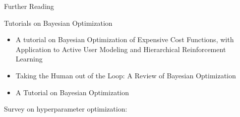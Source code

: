 \begin{frame}[c]{Further Reading}

Tutorials on Bayesian Optimization
\begin{itemize}
    \item A tutorial on Bayesian Optimization of Expensive Cost Functions, with Application to Active User Modeling and Hierarchical Reinforcement Learning 
    \item Taking the Human out of the Loop: A Review of Bayesian Optimization 
    \item A Tutorial on Bayesian Optimization 
\end{itemize}

\bigskip

Survey on hyperparameter optimization:     

\end{frame}